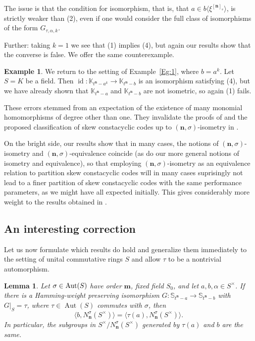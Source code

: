 \documentclass[11pt]{amsart}
\theoremstyle{plain}
\newtheorem{lemma}[theorem]{Lemma}
\theoremstyle{definition}
\newtheorem{example}[theorem]{Example}
\numberwithin{equation}{section}
\numberwithin{figure}{section}
\newcommand{\ring}{S}
\newcommand{\Konenew}[1]{\mathbb{K}_{t^\de-#1}}
\DeclareMathOperator{\id}{id}
\newcommand{\os}{\mathbf{m}}  %
\newcommand{\de}{\mathbf{n}}  %
\DeclareMathOperator{\Aut}{Aut}
\begin{document}
The issue is that the condition for isomorphism, that is, that $a\in b\langle \xi^{[\de]_{s}}\rangle$, is strictly weaker than (2), even if one would consider the full class of isomorphisms of the form $G_{\tau,\alpha,k}$.

Further: taking $k=1$ we see that (1) implies (4), but again our results show that the converse is false.  We offer the same counterexample.

\begin{example}
We return to the setting of Example~\ref{Eg:1}, where $b=a^k$.
Let $S=K$ be a field. Then $\id:\Konenew{a^k}\to\Konenew{b}$ is an isomorphism satisfying (4), but we have already shown that $\Konenew{a}$ and $\Konenew{b}$ are not isometric, so again (1) fails.
\end{example}



These errors stemmed from an expectation of the existence of many monomial homomorphisms of degree other than one.  They
invalidate  the proofs of
   \cite[Theorem 5, Remark 3, Corollary 1,  3, Remark 4]{OuazzouNajmeddineAydin2025} and the proposed classification of skew constacyclic codes up to  $(\de,\sigma)$-isometry in \cite[Sections 5]{OuazzouNajmeddineAydin2025}.


    On the bright side, our results show that in many cases, the notions of $(\de,\sigma)$-isometry and  $(\de,\sigma)$-equivalence coincide (as do our more general notions of isometry and equivalence), so that employing $(\de,\sigma)$-isometry as an equivalence relation to partition skew constacyclic codes will in many cases suprisingly not lead to a finer partition of skew constacyclic codes with the same performance parameters, as we might have all expected initially. This gives considerably more weight to the results obtained in  \cite[Sections 6, 7]{OuazzouNajmeddineAydin2025}.



\subsection{An interesting correction}
Let us now formulate which results do hold and generalize them immediately to the setting of unital commutative rings $\ring$ and allow $\tau$ to be a nontrivial automorphism.

\begin{lemma}\label{le:3.2 general with b in S.II}
Let  $\sigma\in {\rm Aut}(\ring)$ have order $\os$, fixed field $\ring_0$, and let $a,b,\alpha\in S^\times$.
If  there is a Hamming-weight preserving isomorphism
$G:\mathbb{S}_{t^\de-a} \to \mathbb{S}_{t^\de-b}$ with $G|_S=\tau$, where $\tau\in \Aut(\ring)$ commutes with $\sigma$,
 then
 $$\langle b, N_{\de}^\sigma (S^\times) \rangle= \langle \tau(a), N_{\de}^\sigma (S^\times)\rangle.$$
 In particular, the subgroups in $S^\times/N_{\de}^\sigma(S^\times)$ generated by $\tau(a)$ and $b$ are the same.
\end{lemma}
\end{document}
